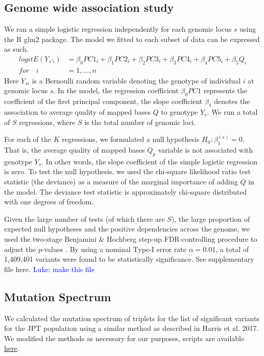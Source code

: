 \documentclass[9pt,lineno]{elife}
\newcommand{\luke}[1]{\textcolor{blue}{Luke: #1}}
\begin{document}
\subsection{Genome wide association study}
We ran a simple logistic regression independently for each genomic locus $s$ using the R glm2 package\citep{RDevelopmentCoreTeam2016}. The model we fitted to each subset of data can be expressed as such.
\begin{align*}
{logit}{E(Y_{s'i})} &= \beta_{0}{PC1}_{i} + \beta_{1}{PC2}_{i} + \beta_{2}{PC3}_{i} + \beta_{3}{PC4}_{i} + \beta_{4}{PC5}_{i} + \beta_{5}Q_{i}
\\
\textit{for}\quad i &= 1,\hdots, n
\end{align*}
Here $Y_{si}$ is a Bernoulli random variable denoting the genotype of individual $i$ at genomic locus $s$. 
In the model, the regression coefficient $\beta_{0}{PC1}$ represents the coefficient of the first principal component, the slope coefficient $\beta_{1}$ denotes the association to average quality of mapped bases $Q$ to genotype $Y_{s}$. 
We run a total of $S$ regressions, where $S$ is the total number of genomic loci. 

For each of the $K$ regressions, we formulated a null hypothesis $H_{0}: \beta_{1}^{(s)}=0$. That is, the average quality of mapped bases $Q_{p}$ variable is not associated with genotype $Y_{s}$.
In other words, the slope coefficient of the simple logistic regression is zero.
To test the null hypothesis, we used the chi-square likelihood ratio test statistic (the deviance) as a measure of the marginal importance of adding $Q$ in the model. 
The deviance test statistic is approximately chi-square distributed with one degrees of freedom.

Given the large number of tests (of which there are $S$), the large proportion of expected null hypotheses and the positive dependencies across the genome, we used the two-stage Benjamini \& Hochberg step-up FDR-controlling procedure to adjust the \textit{p}-values \citep{Benjamini2006}.
By using a nominal Type-I error rate $\alpha = 0.01$, a total of 1,409,401 variants were found to be statistically significance. See supplementary file {here}. \luke{make this file}

\subsection{Mutation Spectrum}
We calculated the mutation spectrum of triplets for the list of significant variants for the JPT population using a similar method as described in Harris et al. 2017. \citep{Harris2017a}
We modified the methods as necessary for our purposes, scripts are available \href{https://github.com/LukeAndersonTrocme/QualityPaper}{here}. 
\end{document}

